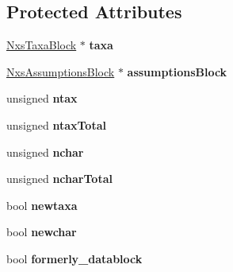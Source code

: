 \subsection*{Protected Attributes}
\begin{DoxyCompactItemize}
\item 
\hypertarget{classNxsCharactersBlock_a568870c5d3b91dfda7a380818cf71089}{
\hyperlink{classNxsTaxaBlock}{NxsTaxaBlock} $\ast$ {\bfseries taxa}}
\label{classNxsCharactersBlock_a568870c5d3b91dfda7a380818cf71089}

\item 
\hypertarget{classNxsCharactersBlock_aafbff474ceaddb7e7ced8763f4f85671}{
\hyperlink{classNxsAssumptionsBlock}{NxsAssumptionsBlock} $\ast$ {\bfseries assumptionsBlock}}
\label{classNxsCharactersBlock_aafbff474ceaddb7e7ced8763f4f85671}

\item 
\hypertarget{classNxsCharactersBlock_a507131223ec9381eb038bdf4f72772c2}{
unsigned {\bfseries ntax}}
\label{classNxsCharactersBlock_a507131223ec9381eb038bdf4f72772c2}

\item 
\hypertarget{classNxsCharactersBlock_ac97ac41ab36654d1740566fd7e025ffa}{
unsigned {\bfseries ntaxTotal}}
\label{classNxsCharactersBlock_ac97ac41ab36654d1740566fd7e025ffa}

\item 
\hypertarget{classNxsCharactersBlock_a1900011b78247598ad421ee1387bc9ab}{
unsigned {\bfseries nchar}}
\label{classNxsCharactersBlock_a1900011b78247598ad421ee1387bc9ab}

\item 
\hypertarget{classNxsCharactersBlock_aac04ff11e093c6fda180123a570a5b25}{
unsigned {\bfseries ncharTotal}}
\label{classNxsCharactersBlock_aac04ff11e093c6fda180123a570a5b25}

\item 
\hypertarget{classNxsCharactersBlock_a1748d02f27126e3e333993855aaf6d0e}{
bool {\bfseries newtaxa}}
\label{classNxsCharactersBlock_a1748d02f27126e3e333993855aaf6d0e}

\item 
\hypertarget{classNxsCharactersBlock_a3ccd76d32f6e970022b115734e326248}{
bool {\bfseries newchar}}
\label{classNxsCharactersBlock_a3ccd76d32f6e970022b115734e326248}

\item 
\hypertarget{classNxsCharactersBlock_a0556d651c9f4878a738590cb45397c3e}{
bool {\bfseries formerly\_\-datablock}}
\label{classNxsCharactersBlock_a0556d651c9f4878a738590cb45397c3e}


\end{DoxyCompactItemize}
